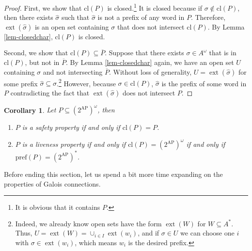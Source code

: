 \documentclass{tufte-handout} %
\newtheorem{cor}[thm]{Corollary}
\theoremstyle{definition}
\theoremstyle{remark}
\newcommand{\0}{\textsf{0}}
\newcommand{\1}{\textsf{1}}
\newcommand{\AP}{\text{AP}}
\DeclareMathOperator{\ext}{ext}
\newcommand{\pref}{\text{pref}}
\newcommand{\cl}{\text{cl}}
\begin{document}
\begin{proof}
	First, we show that $\cl(P)$ is closed.\footnote{It is obvious that it contains $P$.} It is closed because if $\sigma \notin \cl(P)$, then there exists $\hat{\sigma}$ such that $\hat{\sigma}$ is not a prefix of any word in $P$. Therefore, $\ext(\hat{\sigma})$ is an open set containing $\sigma$ that does not intersect $\cl(P)$. By Lemma \ref{lem-closedchar}, $\cl(P)$ is closed.
	
	Second, we show that $\cl(P) \subseteq \overline{P}$. Suppose that there exists $\sigma \in A^{\omega}$ that is in $\cl(P)$, but not in $\overline{P}$. By Lemma \ref{lem-closedchar} again, we have an open set $U$ containing $\sigma$ and not intersecting $\overline{P}$. Without loss of generality, $U = \ext(\hat{\sigma})$ for some prefix $\hat{\sigma} \subseteq \sigma$.\footnote{Indeed, we already know open sets have the form $\ext(W)$ for $W \subseteq A^*$. Thus, $U=\ext(W) = \cup_{i \in I} \ext(w_i)$, and if $\sigma \in U$ we can choose one $i$ with $\sigma \in \ext(w_i)$, which means $w_i$ is the desired prefix.} However, because $\sigma \in \cl(P)$, $\hat{\sigma}$ is the prefix of some word in $P$ contradicting the fact that $\ext(\hat{\sigma})$ does not intersect $P$.
\end{proof}
\begin{cor}
	Let $P \subseteq (2^{\AP})^{\omega}$, then 
	\begin{enumerate}
	\item $P$ is a safety property if and only if $\cl(P) = P$.
	\item $P$ is a liveness property if and only if $\cl(P) = (2^{\AP})^{\omega}$ if and only if $\pref(P)  = (2^{\AP})^*$.
	\end{enumerate}
\end{cor}
Before ending this section, let us spend a bit more time expanding on the properties of Galois connections.
\end{document}
